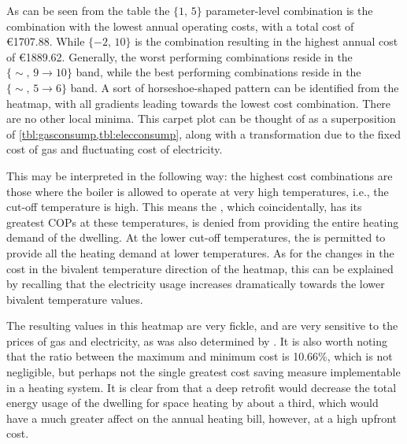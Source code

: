 As can be seen from the table the $\{1\text{, }5\}$ parameter-level combination is the combination with the lowest annual operating costs, with a total cost of €1707.88. While $\{-2\text{, }10\}$ is the combination resulting in the highest annual cost of €1889.62. Generally, the worst performing combinations reside in the $\{\sim\text{, }9\rightarrow10\}$ band, while the best performing combinations reside in the $\{\sim\text{, }5\rightarrow6\}$ band. A sort of horseshoe-shaped pattern can be identified from the heatmap, with all gradients leading towards the lowest cost combination. There are no other local minima. This carpet plot can be thought of as a superposition of \cref{tbl:gasconsump,tbl:elecconsump}, along with a transformation due to the fixed cost of gas and fluctuating cost of electricity. 

This may be interpreted in the following way: the highest cost combinations are those where the boiler is allowed to operate at very high temperatures, i.e., the cut-off temperature is high. This means the \HP, which coincidentally, has its greatest \acp{COP} at these temperatures, is denied from providing the entire heating demand of the dwelling. At the lower cut-off temperatures, the \HP is permitted to provide all the heating demand at lower temperatures. As for the changes in the cost in the bivalent temperature direction of the heatmap, this can be explained by recalling that the electricity usage increases dramatically towards the lower bivalent temperature values. 

The resulting values in this heatmap are very fickle, and are very sensitive to the prices of gas and electricity, as was also determined by \citeauthor{rauschkolb_cost-optimal_2020} \cite{rauschkolb_cost-optimal_2020}. It is also worth noting that the ratio between the maximum and minimum cost is 10.66\%, which is not negligible, but perhaps not the single greatest cost saving measure implementable in a heating system. It is clear from \citeauthor{keogh_technical_2018} \cite{keogh_technical_2018} that a deep retrofit would decrease the total energy usage of the dwelling for space heating by about a third, which would have a much greater affect on the annual heating bill, however, at a high upfront cost.

